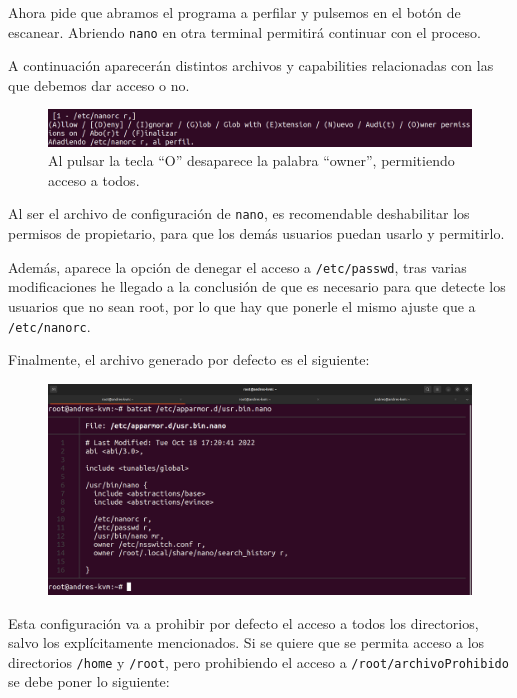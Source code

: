 \documentclass{article}
\begin{document}
Ahora pide que abramos el programa a perfilar y pulsemos en el botón de escanear. Abriendo \verb|nano| en otra terminal permitirá continuar con el proceso.

\bigskip

A continuación aparecerán distintos archivos y capabilities relacionadas con las que debemos dar acceso o no.


\begin{figure}[H]
    \centering
    \includegraphics[width=\textwidth]{imagenes/Captura desde 2022-10-18 17-11-50.png}
    \caption{Al pulsar la tecla ``O'' desaparece la palabra ``owner'', permitiendo acceso a todos.}
\end{figure}

Al ser el archivo de configuración de \verb|nano|, es recomendable deshabilitar los permisos de propietario, para que los demás usuarios puedan usarlo y permitirlo.

\bigskip

Además, aparece la opción de denegar el acceso a \verb|/etc/passwd|, tras varias modificaciones he llegado a la conclusión de que es necesario para que detecte los usuarios que no sean root, por lo que hay que ponerle el mismo ajuste que a \verb|/etc/nanorc|.

\newpage

Finalmente, el archivo generado por defecto es el siguiente:
\begin{figure}[H]
    \centering
    \includegraphics[width=\textwidth]{imagenes/Captura desde 2022-10-18 17-23-45.png}
\end{figure}

Esta configuración va a prohibir por defecto el acceso a todos los directorios, salvo los explícitamente mencionados. Si se quiere que se permita acceso a los directorios \verb|/home| y \verb|/root|, pero prohibiendo el acceso a \verb|/root/archivoProhibido| se debe poner lo siguiente:
\end{document}
